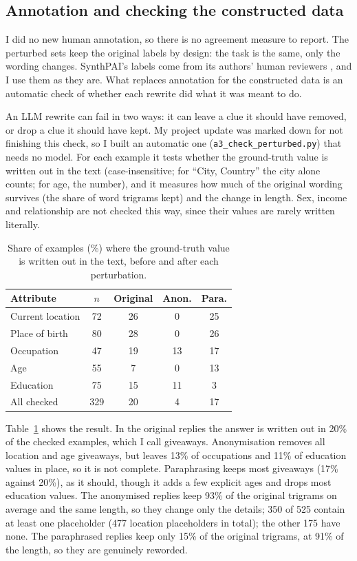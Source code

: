\documentclass[11pt]{article}
\begin{document}
\subsection{Annotation and checking the constructed data}

I did no new human annotation, so there is no agreement measure to report. The perturbed sets keep the original labels by design: the task is the same, only the wording changes. SynthPAI's labels come from its authors' human reviewers \citep{yukhymenko2024synthpai}, and I use them as they are. What replaces annotation for the constructed data is an automatic check of whether each rewrite did what it was meant to do.

An LLM rewrite can fail in two ways: it can leave a clue it should have removed, or drop a clue it should have kept. My project update was marked down for not finishing this check, so I built an automatic one (\texttt{a3\_check\_perturbed.py}) that needs no model. For each example it tests whether the ground-truth value is written out in the text (case-insensitive; for ``City, Country'' the city alone counts; for age, the number), and it measures how much of the original wording survives (the share of word trigrams kept) and the change in length. Sex, income and relationship are not checked this way, since their values are rarely written literally.

\begin{table}[t]
\centering
\small
\begin{tabular}{lcccc}
\toprule
Attribute & $n$ & Original & Anon. & Para. \\
\midrule
Current location & 72 & 26 & 0 & 25 \\
Place of birth & 80 & 28 & 0 & 26 \\
Occupation & 47 & 19 & 13 & 17 \\
Age & 55 & 7 & 0 & 13 \\
Education & 75 & 15 & 11 & 3 \\
\midrule
All checked & 329 & 20 & 4 & 17 \\
\bottomrule
\end{tabular}
\caption{Share of examples (\%) where the ground-truth value is written out in the text, before and after each perturbation.}
\label{tab:check}
\end{table}

Table~\ref{tab:check} shows the result. In the original replies the answer is written out in 20\% of the checked examples, which I call giveaways. Anonymisation removes all location and age giveaways, but leaves 13\% of occupations and 11\% of education values in place, so it is not complete. Paraphrasing keeps most giveaways (17\% against 20\%), as it should, though it adds a few explicit ages and drops most education values. The anonymised replies keep 93\% of the original trigrams on average and the same length, so they change only the details; 350 of 525 contain at least one placeholder (477 location placeholders in total); the other 175 have none. The paraphrased replies keep only 15\% of the original trigrams, at 91\% of the length, so they are genuinely reworded.
\end{document}
